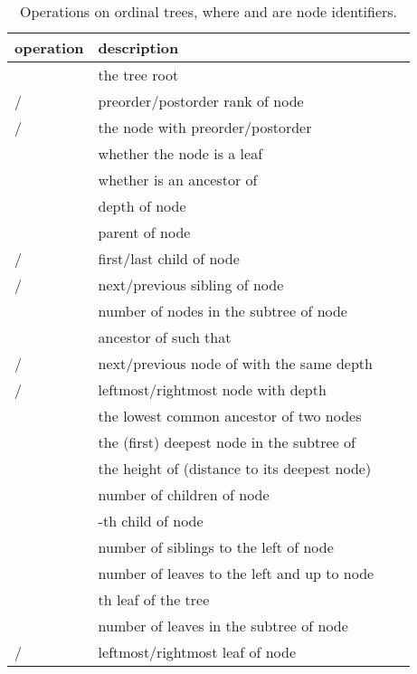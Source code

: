\documentclass[11pt]{article}
\newcommand{\0}{\mathit{0}}
\newcommand{\1}{\mathit{1}}
\begin{document}
\begin{table}[t!]
\caption{Operations on ordinal trees, where  and  are node identifiers.}
\label{tab:ops}
\footnotesize
\begin{center}
  \begin{tabular}{lll|l}
  operation & description \\ \hline
 & the tree root \\
   /  & preorder/postorder rank of node  \\
   /  & the node with preorder/postorder  \\
   & whether the node is a leaf \\
   & whether  is an ancestor of  \\
   & depth of node  \\
   & parent of node  \\
   /  & first/last child of node  \\
   /  & next/previous sibling of node  \\
   & number of nodes in the subtree of node  \\
   & ancestor  of  such that  \\
   /  & next/previous node of  with the same depth \\
   /  & leftmost/rightmost node with depth  \\
   & the lowest common ancestor of two nodes  \\
   & the (first) deepest node in the subtree of  \\
   & the height of  (distance to its deepest node) \\
   &  number of children of node  \\
   & -th child of node  \\
   &  number of siblings to the left of node  \\
 & number of leaves to the left and up to node  \\
   & th leaf of the tree \\
   & number of leaves in the subtree of node  \\
   /  & leftmost/rightmost leaf of node  \\
  \hline
  \end{tabular}
\end{center}
\end{table}
\end{document}
